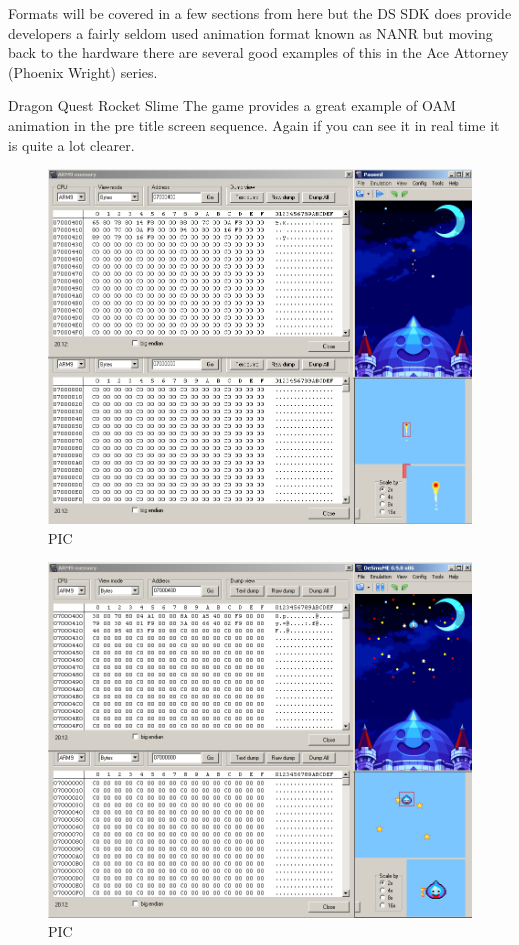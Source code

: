 \documentclass[
]{book}
\begin{document}
Formats will be covered in a few sections from here but the DS SDK does provide developers a fairly seldom used animation format known as NANR but moving back to the hardware there are several good examples of this in the Ace Attorney (Phoenix Wright) series.

Dragon Quest Rocket Slime The game provides a great example of OAM animation in the pre title screen sequence. Again if you can see it in real time it is quite a lot clearer.

\begin{figure}
\centering
\includegraphics{images/48_home_fast6191_romhackingguide_unrenamed_file___ginal_borders_romhackingguideOAManimation_1.png}
\caption{PIC}
\end{figure}

\begin{figure}
\centering
\includegraphics{images/49_home_fast6191_romhackingguide_unrenamed_file___ginal_borders_romhackingguideOAManimation_2.png}
\caption{PIC}
\end{figure}
\end{document}
